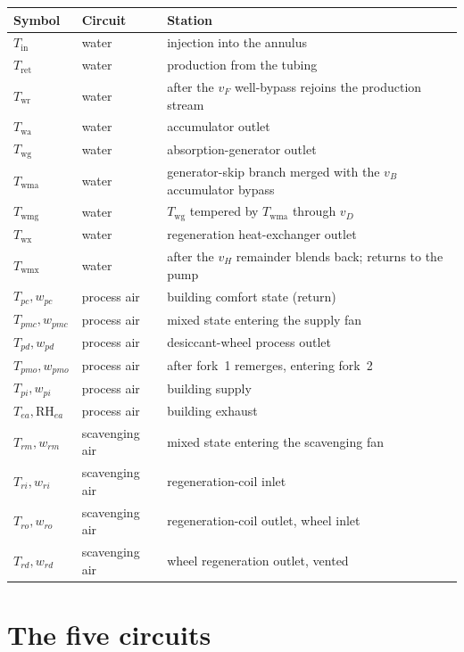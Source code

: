 \documentclass[11pt]{article}
\newcommand{\RH}{\ensuremath{\mathrm{RH}}}
\begin{document}
\begin{longtable}{@{}llp{}@{}}
\toprule
\textbf{Symbol} & \textbf{Circuit} & \textbf{Station} \\
\midrule
\endhead
$T_{\mathrm{in}}$   & water & injection into the annulus \\
$T_{\mathrm{ret}}$  & water & production from the tubing \\
$T_{\mathrm{wr}}$   & water & after the $v_F$ well-bypass rejoins the production stream \\
$T_{\mathrm{wa}}$   & water & accumulator outlet \\
$T_{\mathrm{wg}}$   & water & absorption-generator outlet \\
$T_{\mathrm{wma}}$  & water & generator-skip branch merged with the $v_B$ accumulator bypass \\
$T_{\mathrm{wmg}}$  & water & $T_{\mathrm{wg}}$ tempered by $T_{\mathrm{wma}}$ through $v_D$ \\
$T_{\mathrm{wx}}$   & water & regeneration heat-exchanger outlet \\
$T_{\mathrm{wmx}}$  & water & after the $v_H$ remainder blends back; returns to the pump \\
\midrule
$T_{pc}, w_{pc}$    & process air & building comfort state (return) \\
$T_{pmc}, w_{pmc}$  & process air & mixed state entering the supply fan \\
$T_{pd}, w_{pd}$    & process air & desiccant-wheel process outlet \\
$T_{pmo}, w_{pmo}$  & process air & after fork~1 remerges, entering fork~2 \\
$T_{pi}, w_{pi}$    & process air & building supply \\
$T_{ea}, \RH_{ea}$  & process air & building exhaust \\
\midrule
$T_{rm}, w_{rm}$    & scavenging air & mixed state entering the scavenging fan \\
$T_{ri}, w_{ri}$    & scavenging air & regeneration-coil inlet \\
$T_{ro}, w_{ro}$    & scavenging air & regeneration-coil outlet, wheel inlet \\
$T_{rd}, w_{rd}$    & scavenging air & wheel regeneration outlet, vented \\
\bottomrule
\end{longtable}

\section{The five circuits}
\end{document}
